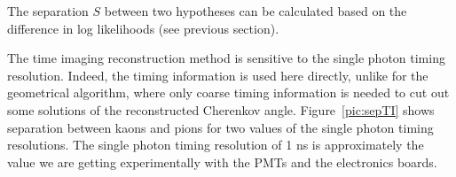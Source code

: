 The separation $S$ between two hypotheses can be calculated based on the difference in log likelihoods (see previous section).

The time imaging reconstruction method is sensitive to the single photon timing resolution. Indeed, the timing information is used here directly, unlike for the geometrical algorithm, where only coarse timing information is needed to cut out some solutions of the reconstructed Cherenkov angle. Figure~\ref{pic:sepTI} shows separation between kaons and pions for two values of the single photon timing resolutions. The single photon timing resolution of 1 ns is approximately the value we are getting experimentally with the PMTs and the electronics boards.
